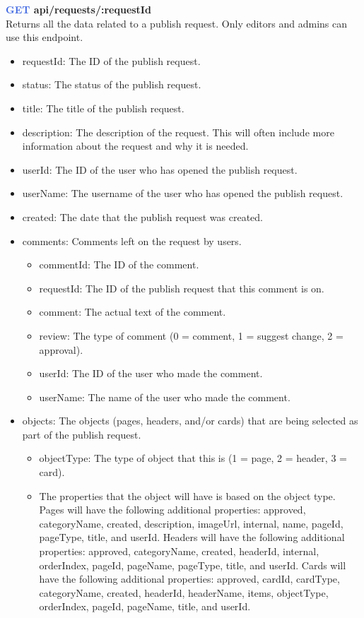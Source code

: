 \documentclass[onecolumn, draftclsnofoot,10pt, compsoc, usenames, dvipsnames]{IEEEtran}
\begin{document}
\noindent
\textbf{\textcolor{RoyalBlue}{GET} api/requests/:requestId} \\
Returns all the data related to a publish request. Only editors and admins can use this endpoint.
\begin{itemize}
    \item requestId: The ID of the publish request.
    \item status: The status of the publish request.
    \item title: The title of the publish request.
    \item description: The description of the request. This will often include more information about the request and why it is needed.
    \item userId: The ID of the user who has opened the publish request.
    \item userName: The username of the user who has opened the publish request.
    \item created: The date that the publish request was created.
    \item comments: Comments left on the request by users.
    \begin{itemize}
        \item commentId: The ID of the comment.
        \item requestId: The ID of the publish request that this comment is on.
        \item comment: The actual text of the comment.
        \item review: The type of comment (0 = comment, 1 = suggest change, 2 = approval).
        \item userId: The ID of the user who made the comment.
        \item userName: The name of the user who made the comment.
    \end{itemize}
    \item objects: The objects (pages, headers, and/or cards) that are being selected as part of the publish request.
    \begin{itemize}
      \item objectType: The type of object that this is (1 = page, 2 = header, 3 = card).
      \item The properties that the object will have is based on the object type. Pages will have the following additional properties: approved, categoryName, created, description, imageUrl, internal, name, pageId, pageType, title, and userId. Headers will have the following additional properties: approved, categoryName, created, headerId, internal, orderIndex, pageId, pageName, pageType, title, and userId. Cards will have the following additional properties: approved, cardId, cardType, categoryName, created, headerId, headerName, items, objectType, orderIndex, pageId, pageName, title, and userId.  
    \end{itemize}
\end{itemize}
\end{document}
